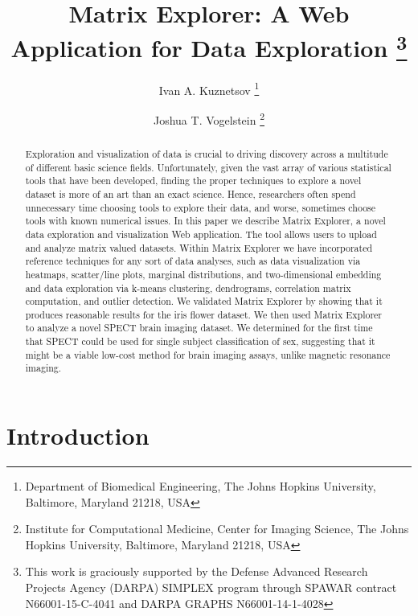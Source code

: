 \documentclass[twoside,leqno,twocolumn]{article}
\begin{document}
\title{Matrix Explorer: A Web Application for Data Exploration%
	\thanks{{This work is graciously supported by the Defense Advanced Research Projects Agency (DARPA) SIMPLEX program through SPAWAR contract N66001-15-C-4041 and DARPA GRAPHS N66001-14-1-4028}}
}


\author{Ivan A. Kuznetsov%
	\thanks{Department of Biomedical Engineering,  The Johns Hopkins University, Baltimore, Maryland 21218, USA}%
	\and
	Joshua T. Vogelstein%
	\footnotemark[2]
	\thanks{Institute for Computational Medicine, Center for Imaging Science, The Johns Hopkins University, Baltimore, Maryland 21218, USA}
}
\date{}
\maketitle

\begin{abstract}\small\baselineskip=9pt
Exploration and visualization of data is crucial to driving discovery across a multitude of different basic science fields. Unfortunately, given the vast array of various statistical tools that have been developed, finding the proper techniques to explore a novel dataset is more of an art than an exact science. Hence, researchers often spend unnecessary time choosing tools to explore their data, and worse, sometimes choose tools with known numerical issues.  In this paper we describe Matrix Explorer, a novel data exploration and visualization Web application. The tool allows users to upload and analyze matrix valued datasets. Within Matrix Explorer we have incorporated reference techniques for any sort of data analyses, such as data visualization via heatmaps, scatter/line plots, marginal distributions, and two-dimensional embedding and data exploration via k-means clustering, dendrograms, correlation matrix computation, and outlier detection. We validated Matrix Explorer by showing that it produces reasonable results for the iris flower dataset. We then used Matrix Explorer to analyze a novel SPECT brain imaging dataset. We determined for the first time that SPECT could be used for single subject classification of sex, suggesting that it might be a viable low-cost method for brain imaging assays, unlike magnetic resonance imaging.
\end{abstract}



\section{Introduction}
\label{sec:intro}
\end{document}
